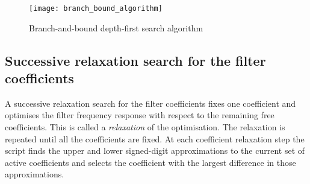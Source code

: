 \documentclass[a4paper,twoside,10pt,english]{article}
\newcommand{\DesignOfSchurLatticeFiltersIncludeScale}{0.85}
\begin{document}
\begin{figure}
\centering
\texttt{[image: branch\_bound\_algorithm]}
\caption{Branch-and-bound depth-first search algorithm}
\label{fig:branch-bound-tree-search-algorithm}
\end{figure}

\subsection{Successive relaxation search for the filter coefficients}
A successive relaxation search for the filter coefficients fixes one
coefficient and optimises the filter frequency response with respect to the
remaining free coefficients. This is called a \emph{relaxation} of the
optimisation. The relaxation is repeated until all the coefficients are fixed.
At each coefficient relaxation step the script finds the upper and lower
signed-digit approximations to the current set of active coefficients and
selects the coefficient with the largest difference in those approximations.
\end{document}
